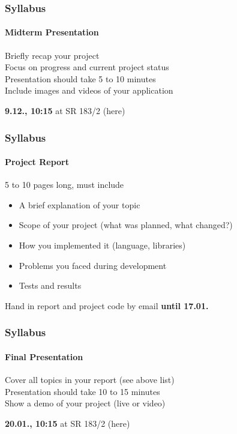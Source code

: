 \documentclass[xetex,professionalfont]{beamer}
\newcommand{\highlight}[1]{\textcolor{tuwcvl_inf_red}{\textbf{#1}}}
\begin{document}

\begin{frame}
\frametitle{Syllabus}
\framesubtitle{Midterm Presentation}

Briefly recap your project\\\medskip
Focus on progress and current project status\\\medskip
Presentation should take 5 to 10 minutes\\\medskip
Include images and videos of your application

\bigskip
\highlight{9.12., 10:15} at SR 183/2 (here)

\end{frame}


\begin{frame}
\frametitle{Syllabus}
\framesubtitle{Project Report}

5 to 10 pages long, must include
\begin{itemize} 
	\item A brief explanation of your topic
	\item Scope of your project (what was planned, what changed?)
	\item How you implemented it (language, libraries)
	\item Problems you faced during development
	\item Tests and results
\end{itemize}

\bigskip
Hand in report and project code by email \highlight{until 17.01.}

\end{frame}


\begin{frame}
\frametitle{Syllabus}
\framesubtitle{Final Presentation}

Cover all topics in your report (see above list)\\\medskip
Presentation should take 10 to 15 minutes\\\medskip
Show a demo of your project (live or video)

\bigskip
\highlight{20.01., 10:15} at SR 183/2 (here)

\end{frame}
\end{document}
